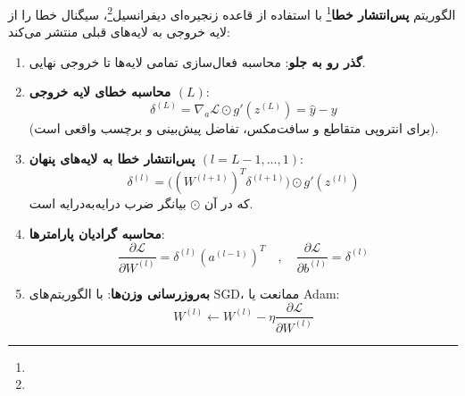 الگوریتم \textbf{پس‌انتشار خطا}\footnote{} با استفاده از قاعده زنجیره‌ای دیفرانسیل\footnote{}، سیگنال خطا را از لایه خروجی به لایه‌های قبلی منتشر می‌کند:

\begin{algorithmbox}
\begin{enumerate}
    \item \textbf{گذر رو به جلو}: محاسبه فعال‌سازی تمامی لایه‌ها تا خروجی نهایی.
    \item \textbf{محاسبه خطای لایه خروجی $(L)$}:
    \begin{equation}
    \delta^{(L)} = \nabla_{a} \mathcal{L} \odot g'(z^{(L)}) = \hat{y} - y
    \end{equation}
    (برای انتروپی متقاطع و سافت‌مکس، تفاضل پیش‌بینی و برچسب واقعی است).
    
    \item \textbf{پس‌انتشار خطا به لایه‌های پنهان $(l = L-1, \dots, 1)$}:
    \begin{equation}
    \delta^{(l)} = \Big( (W^{(l+1)})^T \delta^{(l+1)} \Big) \odot g'(z^{(l)})
    \end{equation}
    که در آن $\odot$ بیانگر ضرب درایه‌به‌درایه  است.
    
    \item \textbf{محاسبه گرادیان پارامترها}:
    \begin{equation}
    \frac{\partial \mathcal{L}}{\partial W^{(l)}} = \delta^{(l)} (a^{(l-1)})^T \quad , \quad \frac{\partial \mathcal{L}}{\partial b^{(l)}} = \delta^{(l)}
    \end{equation}
    
    \item \textbf{به‌روزرسانی وزن‌ها}: با الگوریتم‌های SGD، ممانعت یا Adam:
    \begin{equation}
    W^{(l)} \leftarrow W^{(l)} - \eta \frac{\partial \mathcal{L}}{\partial W^{(l)}}
    \end{equation}
\end{enumerate}
\end{algorithmbox}

